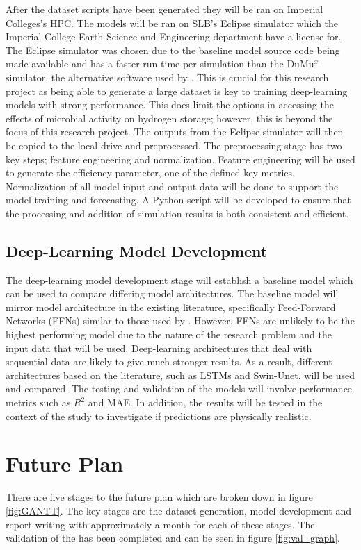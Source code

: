 \documentclass[12pt]{article}
\begin{document}
After the dataset scripts have been generated they will be ran on Imperial Colleges's HPC. The models will be ran on SLB's Eclipse simulator which the Imperial College Earth Science and Engineering department have a license for. The Eclipse simulator was chosen due to the baseline model source code being made available and has a faster run time per simulation than the DuMu$^x$ simulator, the alternative software used by \citet{hogeweg2022benchmark}. This is crucial for this research project as being able to generate a large dataset is key to training deep-learning models with strong performance. This does limit the options in accessing the effects of microbial activity on hydrogen storage; however, this is beyond the focus of this research project. The outputs from the Eclipse simulator will then be copied to the local drive and preprocessed. The preprocessing stage has two key steps; feature engineering and normalization. Feature engineering will be used to generate the efficiency parameter, one of the defined key metrics. Normalization of all model input and output data will be done to support the model training and forecasting. A Python script will be developed to ensure that the processing and addition of simulation results is both consistent and efficient.  

\subsection{Deep-Learning Model Development}
The deep-learning model development stage will establish a baseline model which can be used to compare differing model architectures. The baseline model will mirror model architecture in the existing literature, specifically Feed-Forward Networks (FFNs) similar to those used by \citet{mao2024efficient, MAOcushion, chellal2025quantitative}. However, FFNs are unlikely to be the highest performing model due to the nature of the research problem and the input data that will be used. Deep-learning architectures that deal with sequential data are likely to give much stronger results. As a result, different architectures based on the literature, such as LSTMs and Swin-Unet, will be used and compared. The testing and validation of the models will involve performance metrics such as $R^2$ and MAE. In addition, the results will be tested in the context of the study to investigate if predictions are physically realistic.

\section{Future Plan}
There are five stages to the future plan which are broken down in figure \ref{fig:GANTT}. The key stages are the dataset generation, model development and report writing with approximately a month for each of these stages. The validation of the \citet{hogeweg2022benchmark} has been completed and can be seen in figure \ref{fig:val_graph}.
\end{document}
